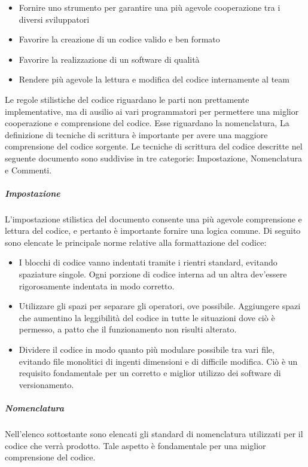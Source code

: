 \begin{itemize}
	\item Fornire uno strumento per garantire una più agevole cooperazione tra i diversi sviluppatori
	\item Favorire la creazione di un codice valido e ben formato
	\item Favorire la realizzazione di un software di qualità
	\item Rendere più agevole la lettura e modifica del codice internamente al team
\end{itemize}

Le regole stilistiche del codice riguardano le parti non prettamente implementative, ma di ausilio ai vari programmatori per permettere una miglior cooperazione e comprensione del codice. Esse riguardano la nomenclatura, La definizione di tecniche di scrittura è importante per avere una maggiore comprensione del codice sorgente.
Le tecniche di scrittura del codice descritte nel seguente documento sono suddivise in tre categorie: Impostazione, Nomenclatura e Commenti.

\subparagraph{Impostazione}
L'impostazione stilistica del documento consente una più agevole comprensione e lettura del codice, e pertanto è importante fornire una logica comune. Di seguito sono elencate le principale norme relative alla formattazione del codice: 

\begin{itemize}
	\item
	I blocchi di codice vanno indentati tramite i rientri standard, evitando spaziature singole. Ogni porzione di codice interna ad un altra dev'essere rigorosamente indentata in modo corretto.
	\item
	Utilizzare gli spazi per separare gli operatori, ove possibile. Aggiungere spazi che aumentino la leggibilità del codice in tutte le situazioni dove ciò è permesso, a patto che il funzionamento non risulti alterato.
	\item
	Dividere il codice in modo quanto più modulare possibile tra vari file, evitando file monolitici di ingenti dimensioni e di difficile modifica. Ciò è un requisito fondamentale per un corretto e miglior utilizzo dei software di versionamento.
\end{itemize}

\subparagraph{Nomenclatura}

Nell'elenco sottostante sono elencati gli standard di nomenclatura utilizzati per il codice che verrà prodotto. Tale aspetto è fondamentale per una miglior comprensione del codice.

